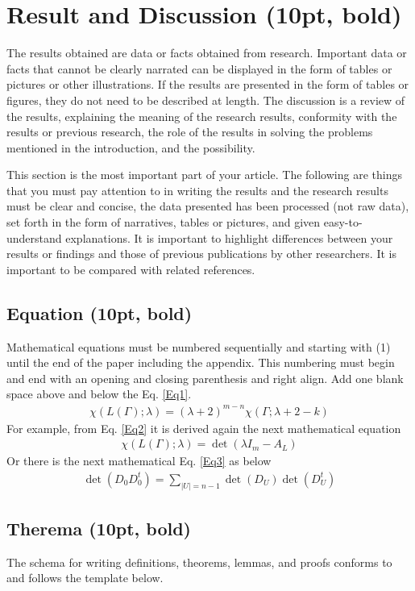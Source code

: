 \documentclass{article}
\newcounter{lemma}
\newcounter{theorem}
\begin{document}
\section{Result and Discussion (10pt, bold)}
The results obtained are data or facts obtained from research. Important data or facts that cannot be clearly narrated can be displayed in the form of tables or pictures or other illustrations. If the results are presented in the form of tables or figures, they do not need to be described at length. The discussion is a review of the results, explaining the meaning of the research results, conformity with the results or previous research, the role of the results in solving the problems mentioned in the introduction, and the possibility.

This section is the most important part of your article. The following are things that you must pay attention to in writing the results and the research results must be clear and concise, the data presented has been processed (not raw data), set forth in the form of narratives, tables or pictures, and given easy-to-understand explanations. It is important to highlight differences between your results or findings and those of previous publications by other researchers. It is important to be compared with related references.
\subsection{Equation (10pt, bold)}
Mathematical equations must be numbered sequentially and starting with (1) until the end of the paper including the appendix. This numbering must begin and end with an opening and closing parenthesis and right align. Add one blank space above and below the Eq. \ref{Eq1}.
\begin{eqnarray}
	\chi(L(\Gamma); \lambda)=(\lambda+2)^{m-n}\chi(\Gamma;\lambda+2-k)
	\label{Eq1}
\end{eqnarray}
For example, from Eq. \ref{Eq2} it is derived again the next mathematical equation
\begin{eqnarray}
	\chi(L(\Gamma); \lambda)=\det (\lambda I_{m}-A_{L})
		\label{Eq2}
\end{eqnarray}
Or there is the next mathematical Eq. \ref{Eq3} as below
\begin{eqnarray}
\det(D_{0}D_{0}^{t})=\sum_{|U|=n-1} \det(D_{U})\det(D_{U}^{t})
	\label{Eq3}
\end{eqnarray}
\subsection{Therema (10pt, bold)}
The schema for writing definitions, theorems, lemmas, and proofs conforms to and follows the template below.
\end{document}
